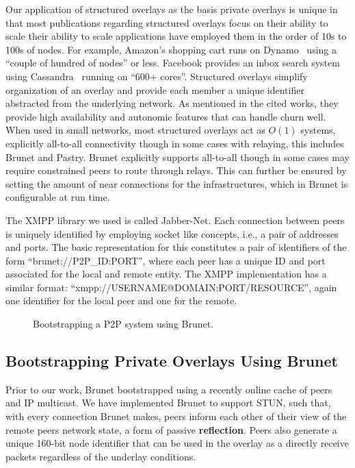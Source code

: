 \documentclass[conference]{IEEEtran}
\begin{document}
Our application of structured overlays as the basis private overlays is unique
in that most publications regarding structured overlays focus on their ability
to scale their ability to scale applications have employed them in the order of
10s to 100s of nodes.  For example, Amazon's shopping cart runs on
Dynamo~\cite{dynamo} using a ``couple of hundred of nodes'' or less.  Facebook
provides an inbox search system using Cassandra~\cite{cassandra} running on
``600+ cores''.  Structured overlays simplify organization of an overlay and
provide each member a unique identifier abstracted from the underlying network.
As mentioned in the cited works, they provide high availability and autonomic
features that can handle churn well.  When used in small networks, most
structured overlays act as $O(1)$ systems, explicitly all-to-all connectivity
though in some cases with relaying, this includes Brunet and Pastry.  Brunet
explicitly supports all-to-all though in some cases may require constrained
peers to route through relays.  This can further be ensured by setting the
amount of near connections for the infrastructures, which in Brunet is
configurable at run time.

The XMPP library we used is called Jabber-Net.  Each connection between peers
is uniquely identified by employing socket like concepts, i.e., a pair of
addresses and ports.  The basic representation for this constitutes a pair of
identifiers of the form ``brunet://P2P\_ID:PORT'', where each peer has a unique
ID and port associated for the local and remote entity.  The XMPP
implementation has a similar format: ``xmpp://USERNAME@DOMAIN:PORT/RESOURCE'',
again one identifier for the local peer and one for the remote.

\begin{figure*}[h!t!]
\centering
{}
\caption{Bootstrapping a P2P system using Brunet.}
\label{fig:bootstrap_brunet}
\end{figure*}

\subsection{Bootstrapping Private Overlays Using Brunet}
\label{brunet_bootstrapping}

Prior to our work, Brunet bootstrapped using a recently online cache of peers
and IP multicast.  We have implemented Brunet to support STUN, such that, with
every connection Brunet makes, peers inform each other of their view of the
remote peers network state, a form of passive \textbf{reflection}.  Peers also
generate a unique 160-bit node identifier that can be used in the overlay as a
directly receive packets regardless of the underlay conditions.
\end{document}
